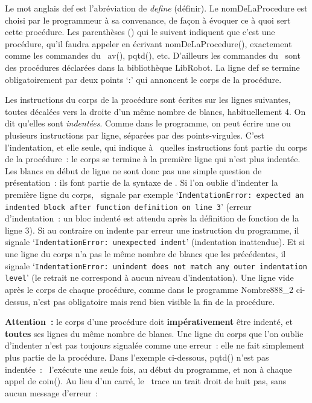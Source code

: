 Le mot anglais {\mcl def} est l'abréviation de {\em define} (définir).
Le {\idt  nomDeLaProcedure} est choisi par le programmeur
à sa convenance, de façon à évoquer ce
à quoi sert cette procédure. Les parenthèses {\idt ()} qui le suivent indiquent
que c'est une procédure, qu'il faudra appeler en écrivant {\idt nomDeLaProcedure()}, 
exactement comme les commandes du \robot\ {\idt av()}, {\idt pqtd()}, etc. 
D'ailleurs les commandes du \robot\ sont des procédures déclarées dans la 
bibliothèque {\idt LibRobot}. La ligne {\mcl def} se termine obligatoirement par 
deux points `{\idt :}' qui annoncent le corps de la procédure.

Les instructions du corps de la procédure sont écrites sur les lignes 
suivantes, toutes décalées vers la droite d'un même nombre de blancs, 
habituellement 4. On dit qu'elles sont {\em indentées}. 
Comme dans le programme, on peut écrire une ou plusieurs instructions par ligne, séparées 
par des points-virgules. C'est l'indentation, et elle seule, qui indique à \python\ 
quelles instructions font partie du corps de la procédure~: le corps se termine à 
la première ligne qui n'est plus indentée. Les blancs en début de ligne ne sont donc 
pas une simple question de présentation~: ils font partie de la syntaxe de \python. 
Si l'on oublie d'indenter la première ligne du corps, \python\ signale par exemple
`{\tt IndentationError: expected an indented block after function definition on line 3}' 
(erreur d'indentation~: un bloc indenté est attendu après la définition de fonction de 
la ligne 3). Si au contraire on indente par erreur une instruction du programme, il signale 
`{\tt IndentationError: unexpected indent}' (indentation inattendue). Et si une ligne du 
corps n'a pas le même nombre de blancs que les précédentes, il signale 
`{\tt IndentationError: unindent does not match any outer indentation level}' 
(le retrait ne correspond à aucun niveau d'indentation). Une ligne vide après le corps 
de chaque procédure, comme dans le programme {\idt Nombre888\_2} ci-dessus, 
n'est pas obligatoire mais rend bien visible la fin de la procédure.

{\bf Attention~:} le corps d'une procédure doit {\bf impérativement} être indenté, et 
{\bf toutes} ses lignes du même nombre de blancs. Une ligne du corps que l'on oublie 
d'indenter n'est pas toujours signalée comme une erreur~: elle ne fait simplement plus 
partie de la procédure. Dans l'exemple ci-dessous, {\idt pqtd()} n'est pas indentée~:
\python\ l'exécute une seule fois, au début du programme, et non à chaque appel de 
{\idt coin()}. Au lieu d'un carré, le \robot\ trace un trait droit de huit pas, sans 
aucun message d'erreur~:

